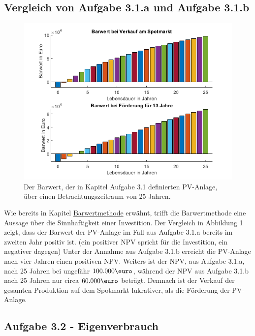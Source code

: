 \documentclass[a4paper,12pt]{article}
\begin{document}
	\subsection{Vergleich von Aufgabe 3.1.a und Aufgabe 3.1.b}
	\begin{figure}[H]
		\centering
		\includegraphics[width=12cm]{img/results/BarwertVergleich}
		\caption{Der Barwert, der in Kapitel Aufgabe 3.1 definierten PV-Anlage, über einen Betrachtungszeitraum von 25 Jahren.}
	\end{figure}
	Wie bereits in Kapitel \hyperref[sec:BerechnungenBarwertmethode]{Barwertmethode} erwähnt, trifft die Barwertmethode eine Aussage über die Sinnhaftigkeit einer Investition.\newline
	Der Vergleich in Abbildung 1 zeigt, dass der Barwert der PV-Anlage im Fall aus Aufgabe 3.1.a bereits im zweiten Jahr positiv ist. (ein positiver NPV spricht für die Investition, ein negativer dagegen)\newline
	Unter der Annahme aus Aufgabe 3.1.b erreicht die PV-Anlage nach vier Jahren einen positiven NPV. Weiters ist der NPV, aus Aufgabe 3.1.a, nach 25 Jahren bei ungefähr $100.000\mbox{\euro}$, während der NPV aus Aufgabe 3.1.b nach 25 Jahren nur circa $60.000\mbox{\euro}$ beträgt.\newline
	Demnach ist der Verkauf der gesamten Produktion auf dem Spotmarkt lukrativer, als die Förderung der PV-Anlage.
	\subsection{Aufgabe 3.2 - Eigenverbrauch}
\end{document}
